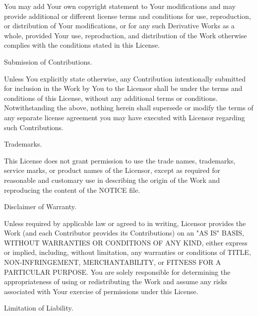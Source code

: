 You may add Your own copyright statement to Your modifications and may provide additional or different license terms and conditions for use, reproduction, or distribution of Your modifications, or for any such Derivative Works as a whole, provided Your use, reproduction, and distribution of the Work otherwise complies with the conditions stated in this License.


\begin{DoxyEnumerate}
\item Submission of Contributions.
\end{DoxyEnumerate}

Unless You explicitly state otherwise, any Contribution intentionally submitted for inclusion in the Work by You to the Licensor shall be under the terms and conditions of this License, without any additional terms or conditions. Notwithstanding the above, nothing herein shall supersede or modify the terms of any separate license agreement you may have executed with Licensor regarding such Contributions.


\begin{DoxyEnumerate}
\item Trademarks.
\end{DoxyEnumerate}

This License does not grant permission to use the trade names, trademarks, service marks, or product names of the Licensor, except as required for reasonable and customary use in describing the origin of the Work and reproducing the content of the NOTICE file.


\begin{DoxyEnumerate}
\item Disclaimer of Warranty.
\end{DoxyEnumerate}

Unless required by applicable law or agreed to in writing, Licensor provides the Work (and each Contributor provides its Contributions) on an "{}\+AS IS"{} BASIS, WITHOUT WARRANTIES OR CONDITIONS OF ANY KIND, either express or implied, including, without limitation, any warranties or conditions of TITLE, NON-\/\+INFRINGEMENT, MERCHANTABILITY, or FITNESS FOR A PARTICULAR PURPOSE. You are solely responsible for determining the appropriateness of using or redistributing the Work and assume any risks associated with Your exercise of permissions under this License.


\begin{DoxyEnumerate}
\item Limitation of Liability.
\end{DoxyEnumerate}

